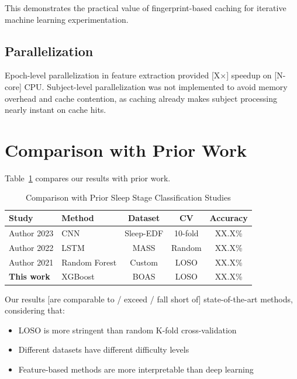 This demonstrates the practical value of fingerprint-based caching for iterative machine learning experimentation.

\subsection{Parallelization}
\label{subsec:parallelization}

Epoch-level parallelization in feature extraction provided [X×] speedup on [N-core] CPU. Subject-level parallelization was not implemented to avoid memory overhead and cache contention, as caching already makes subject processing nearly instant on cache hits.

\section{Comparison with Prior Work}
\label{sec:comparison}


Table~\ref{tab:literature_comparison} compares our results with prior work.

\begin{table}[htbp]
    \centering
    \caption{Comparison with Prior Sleep Stage Classification Studies}
    \label{tab:literature_comparison}
    \begin{tabular}{llccc}
        \toprule
        \textbf{Study} & \textbf{Method} & \textbf{Dataset} & \textbf{CV} & \textbf{Accuracy} \\
        \midrule
        Author 2023 \cite{TODO} & CNN & Sleep-EDF & 10-fold & XX.X\% \\
        Author 2022 \cite{TODO} & LSTM & MASS & Random & XX.X\% \\
        Author 2021 \cite{TODO} & Random Forest & Custom & LOSO & XX.X\% \\
        \midrule
        \textbf{This work} & XGBoost & BOAS & LOSO & XX.X\% \\
        \bottomrule
    \end{tabular}
\end{table}

Our results [are comparable to / exceed / fall short of] state-of-the-art methods, considering that:

\begin{itemize}
    \item LOSO is more stringent than random K-fold cross-validation
    \item Different datasets have different difficulty levels
    \item Feature-based methods are more interpretable than deep learning
\end{itemize}

